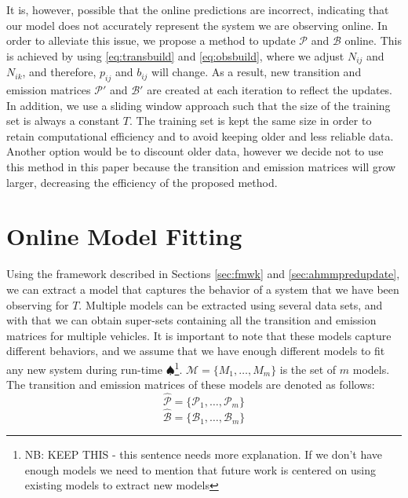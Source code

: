 \documentclass[letterpaper, 10 pt, conference]{ieeeconf}  %
\newcommand\NB[1]{$\spadesuit$\footnote{NB: #1}}
\newcommand\RP[1]{$\clubsuit$\footnote{RP: #1}}
\begin{document}
It is, however, possible that the online predictions are incorrect, indicating that our model does not accurately represent the system we are observing online. In order to alleviate this issue, we propose a method to update $\mathcal{P}$ and $\mathcal{B}$ online. This is achieved by using \eqref{eq:transbuild} and \eqref{eq:obsbuild}, where we adjust $N_{ij}$ and $N_{ik}$, and therefore, $p_{ij}$ and $b_{ij}$ will change. As a result, new transition and emission matrices $\mathcal{P'}$ and $\mathcal{B'}$ are created at each iteration to reflect the updates. In addition, we use a sliding window approach such that the size of the training set is always a constant $T$. %
The training set is kept the same size in order to retain computational efficiency and to avoid keeping older and less reliable data. Another option would be to discount older data, however we decide not to use this method in this paper because the transition and emission matrices will grow larger, decreasing the efficiency of the proposed method. 

\section{Online Model Fitting}\label{sec:omf}
Using the framework described in Sections \ref{sec:fmwk} and \ref{sec:ahmmpredupdate}, we can extract a model that captures the behavior of a system that we have been observing for $T$. Multiple models can be extracted using several data sets, and with that we can obtain super-sets containing all the transition and emission matrices for multiple vehicles. It is important to note that these models capture different behaviors, and we assume that we have enough different models to fit any new system during run-time \NB{KEEP THIS - this sentence needs more explanation. If we don't have enough models we need to mention that future work is centered on using existing models to extract new models}. $\mathcal{M} = \{M_1,\ldots,M_m\}$ is the set of $m$ models. %
The transition and emission matrices of these models are denoted as follows: %
\begin{equation}
    \hat{\mathcal{P}} = \{\mathcal{P}_1,\ldots,\mathcal{P}_m\}
\end{equation}
\begin{equation}
    \hat{\mathcal{B}} = \{\mathcal{B}_1,\ldots,\mathcal{B}_{m}\}
\end{equation}
\end{document}
